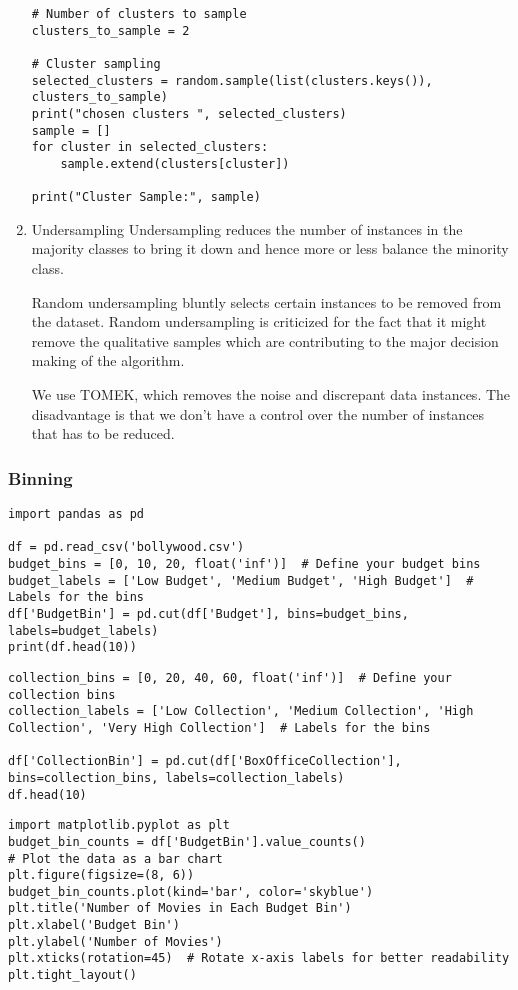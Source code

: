 \documentclass[11pt]{article}
\begin{document}
\begin{enumerate}
\begin{verbatim}
# Number of clusters to sample
clusters_to_sample = 2

# Cluster sampling
selected_clusters = random.sample(list(clusters.keys()), clusters_to_sample)
print("chosen clusters ", selected_clusters)
sample = []
for cluster in selected_clusters:
    sample.extend(clusters[cluster])

print("Cluster Sample:", sample)
\end{verbatim}
\item Undersampling
\label{sec:orge869d0f}
Undersampling reduces the number of instances in the majority classes to bring it down and hence more or less balance the minority class.

Random undersampling bluntly selects certain instances to be removed from the dataset. Random undersampling is criticized for the fact that it might remove the qualitative samples which are contributing to the major decision making of the algorithm.

We use TOMEK, which removes the noise and discrepant data instances. The disadvantage is that we don't have a control over the number of instances that has to be reduced.
\end{enumerate}
\subsubsection{Binning}
\label{sec:orgf336574}
\begin{verbatim}
import pandas as pd

df = pd.read_csv('bollywood.csv')
budget_bins = [0, 10, 20, float('inf')]  # Define your budget bins
budget_labels = ['Low Budget', 'Medium Budget', 'High Budget']  # Labels for the bins
df['BudgetBin'] = pd.cut(df['Budget'], bins=budget_bins, labels=budget_labels)
print(df.head(10))
\end{verbatim}

\begin{verbatim}
collection_bins = [0, 20, 40, 60, float('inf')]  # Define your collection bins
collection_labels = ['Low Collection', 'Medium Collection', 'High Collection', 'Very High Collection']  # Labels for the bins

df['CollectionBin'] = pd.cut(df['BoxOfficeCollection'], bins=collection_bins, labels=collection_labels)
df.head(10)
\end{verbatim}

\begin{verbatim}
import matplotlib.pyplot as plt
budget_bin_counts = df['BudgetBin'].value_counts()
# Plot the data as a bar chart
plt.figure(figsize=(8, 6))
budget_bin_counts.plot(kind='bar', color='skyblue')
plt.title('Number of Movies in Each Budget Bin')
plt.xlabel('Budget Bin')
plt.ylabel('Number of Movies')
plt.xticks(rotation=45)  # Rotate x-axis labels for better readability
plt.tight_layout()
\end{verbatim}
\end{document}
